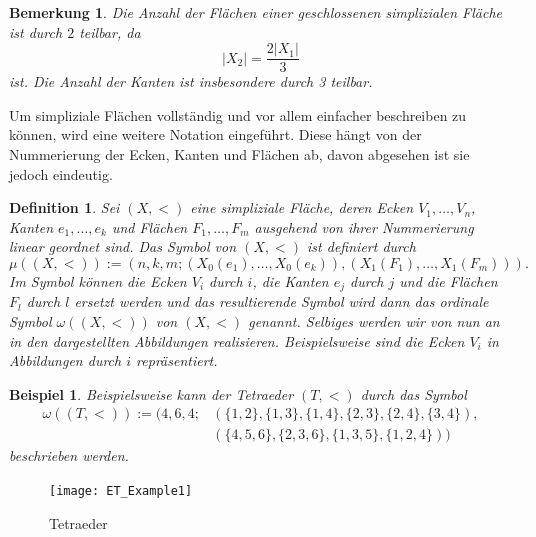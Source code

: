 \documentclass[12pt,titlepage,twoside,cleardoublepage]{article}
\theoremstyle{nummermitklammern}
\newtheorem{bsp}[temp]{Beispiel}
\newtheorem{definition}[temp]{Definition}
\newtheorem{bemerkung}[temp]{Bemerkung}
\newtheorem{definition}[zahl]{Definition}
\newtheorem{bsp}[zahl]{Beispiel}
\newtheorem{bemerkung}[zahl]{Bemerkung}
\numberwithin{equation}{section}
\begin{document}
\begin{bemerkung}
Die Anzahl der Flächen einer geschlossenen simplizialen Fläche ist durch $2$ teilbar, da
\[
\vert X_{2} \vert = \frac{2\vert X_{1}\vert}{3}
\]
ist.
Die Anzahl der Kanten ist insbesondere durch 3 teilbar. 
\end{bemerkung}
Um simpliziale Flächen vollständig und vor allem einfacher beschreiben zu können, wird eine weitere Notation eingeführt. Diese hängt von der Nummerierung der Ecken, Kanten und Flächen ab, davon abgesehen ist sie jedoch eindeutig.
\begin{definition}
 Sei $(X,<)$ eine simpliziale Fläche, deren Ecken $V_{1},\ldots,V_{n}$, Kanten $e_{1},\ldots,e_{k}$ und Flächen $F_{1},\ldots,F_{m}$ ausgehend von ihrer Nummerierung linear geordnet sind. Das \emph{Symbol} von $(X,<)$ ist definiert durch 
\[
\mu((X,<)):=(n,k,m;(X_{0}(e_{1}),\ldots,X_{0}(e_{k})),(X_{1}(F_{1}),\ldots,X_{1}(F_{m}))).
\]
Im Symbol können die Ecken $V_{i}$ durch $i$, die Kanten $e_{j}$ durch $j$ und die Flächen $F_{l}$ durch $l$ ersetzt werden und das resultierende Symbol wird dann das \emph{ordinale Symbol} $\omega((X,<))$ von $(X,<)$ genannt. Selbiges werden wir von nun an in den dargestellten Abbildungen realisieren. Beispielsweise sind die Ecken $V_i$ in Abbildungen durch $i$ repräsentiert. 
\end{definition}
\begin{bsp}
Beispielsweise kann der Tetraeder $(T,<)$ durch das Symbol 
\begin{align*}
\omega ((T,<)):=(4,6,4;&(\{1,2\}, \{1,3\},\{1,4\},\{2,3\},\{2,4\},\{3,4\}),\\
&(\{4,5,6\},\{2,3,6\},\{1,3,5\},\{1,2,4\}))
\end{align*}
beschrieben werden.
\end{bsp}
\begin{figure}[H]
\begin{center}
\texttt{[image: ET\_Example1]}
\end{center}
\caption{Tetraeder}
\end{figure}
\end{document}

